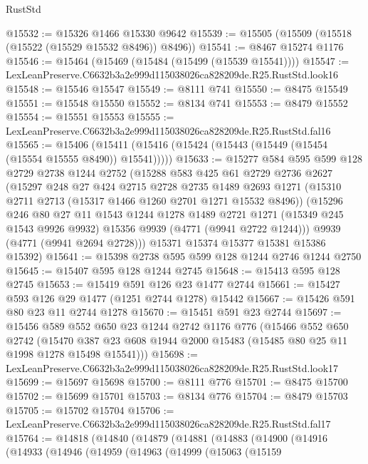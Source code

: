 \begin{lexlean}{RustStd}
\begin{coremodule}
@15532 := @15326 @1466 @15330 @9642
@15539 := @15505 (@15509 (@15518 (@15522 (@15529 @15532 @8496)) @8496))
@15541 := @8467 @15274 @1176
@15546 := @15464 (@15469 (@15484 (@15499 (@15539 @15541))))
@15547 := LexLeanPreserve.C6632b3a2e999d115038026ca828209de.R25.RustStd.look16
@15548 := @15546 @15547
@15549 := @8111 @741
@15550 := @8475 @15549
@15551 := @15548 @15550
@15552 := @8134 @741
@15553 := @8479 @15552
@15554 := @15551 @15553
@15555 := LexLeanPreserve.C6632b3a2e999d115038026ca828209de.R25.RustStd.fal16
@15565 := @15406 (@15411 (@15416 (@15424 (@15443 (@15449 (@15454 (@15554 @15555 @8490)) @15541)))))
@15633 := @15277
    @584
    @595
    @599
    @128
    @2729
    @2738
    @1244
    @2752
    (@15288
      @583
      @425
      @61
      @2729
      @2736
      @2627
      (@15297
        @248
        @27
        @424
        @2715
        @2728
        @2735
        @1489
        @2693
        @1271
        (@15310 @2711 @2713 (@15317 @1466 @1260 @2701 @1271 @15532 @8496))
        (@15296
          @246
          @80
          @27
          @11
          @1543
          @1244
          @1278
          @1489
          @2721
          @1271
          (@15349 @245 @1543 @9926 @9932)
          @15356
          @9939
          (@4771 (@9941 @2722 @1244)))
        @9939
        (@4771 (@9941 @2694 @2728)))
      @15371
      @15374
      @15377
      @15381
      @15386
      @15392)
@15641 := @15398 @2738 @595 @599 @128 @1244 @2746 @1244 @2750
@15645 := @15407 @595 @128 @1244 @2745
@15648 := @15413 @595 @128 @2745
@15653 := @15419 @591 @126 @23 @1477 @2744
@15661 := @15427 @593 @126 @29 @1477 (@1251 @2744 @1278) @15442
@15667 := @15426 @591 @80 @23 @11 @2744 @1278
@15670 := @15451 @591 @23 @2744
@15697 := @15456
    @589
    @552
    @650
    @23
    @1244
    @2742
    @1176
    @776
    (@15466
      @552
      @650
      @2742
      (@15470 @387 @23 @608 @1944 @2000 @15483 (@15485 @80 @25 @11 @1998 @1278 @15498 @15541)))
@15698 := LexLeanPreserve.C6632b3a2e999d115038026ca828209de.R25.RustStd.look17
@15699 := @15697 @15698
@15700 := @8111 @776
@15701 := @8475 @15700
@15702 := @15699 @15701
@15703 := @8134 @776
@15704 := @8479 @15703
@15705 := @15702 @15704
@15706 := LexLeanPreserve.C6632b3a2e999d115038026ca828209de.R25.RustStd.fal17
@15764 := @14818
    (@14840
      (@14879
        (@14881
          (@14883
            (@14900
              (@14916
                (@14933
                  (@14946
                    (@14959
                      (@14963
                        (@14999
                          (@15063
                            (@15159

\end{coremodule}
\end{lexlean}

